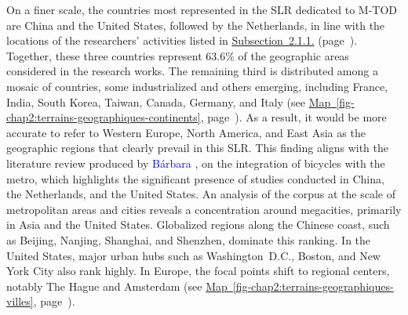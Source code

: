 \begin{refsegment}
On a finer scale, the countries most represented in the \acrshort{SLR} dedicated to \acrshort{M-TOD} are China and the United States, followed by the Netherlands, in line with the locations of the researchers' activities listed in \hyperref[chap2:analyse-bibliometrique]{Subsection~2.1.1.} (page~\pageref{chap2:analyse-bibliometrique}). Together, these three countries represent 63.6\% of the geographic areas considered in the research works. The remaining third is distributed among a mosaic of countries, some industrialized and others emerging, including France, India, South Korea, Taiwan, Canada, Germany, and Italy (see \hyperref[fig-chap2:terrains-geographiques-continents]{Map~\ref{fig-chap2:terrains-geographiques-continents}}, page~\pageref{fig-chap2:terrains-geographiques-continents}). As a result, it would be more accurate to refer to Western Europe, North America, and East Asia as the geographic regions that clearly prevail in this \acrshort{SLR}. This finding aligns with the literature review produced by \textcolor{blue}{Bárbara} \textcolor{blue}{\textcite[17]{jansson_almeida_alternativas_2022}}, on the integration of bicycles with the metro, which highlights the significant presence of studies conducted in China, the Netherlands, and the United States. An analysis of the corpus at the scale of metropolitan areas and cities reveals a concentration around megacities, primarily in Asia and the United States. Globalized regions along the Chinese coast, such as Beijing, Nanjing, Shanghai, and Shenzhen, dominate this ranking. In the United States, major urban hubs such as Washington~D.C., Boston, and New York City also rank highly. In Europe, the focal points shift to regional centers, notably The Hague and Amsterdam (see \hyperref[fig-chap2:terrains-geographiques-villes]{Map~\ref{fig-chap2:terrains-geographiques-villes}}, page~\pageref{fig-chap2:terrains-geographiques-villes}).%


\end{refsegment}
